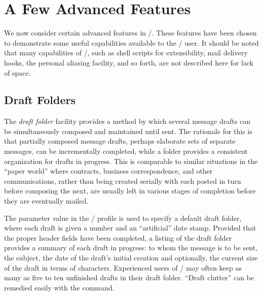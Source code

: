 \section{A Few Advanced Features}		%
We now consider certain advanced features in \MH/.
These features have been chosen to demonstrate some useful capabilities
available to the \MH/ user.
It should be noted that many capabilities of \MH/,
such as shell scripts for extensibility,
mail delivery hooks,
the personal aliasing facility,
and so forth,
are not described here for lack of space.

\subsection{Draft Folders}			%
The {\it draft folder} facility provides a method by which several
message drafts can be simultaneously composed and maintained until
sent.
The rationale for this is that partially composed message drafts,
perhaps elaborate sets of separate messages,
can be incrementally completed,
while a folder provides a consistent organization for drafts in progress.
This is comparable to similar situations in the ``paper world'' where
contracts, business correspondence, and other communications,
rather than being created serially with each posted in turn before composing
the next,
are usually left in various stages of
completion before they are eventually mailed.

The  parameter value in the \MH/ profile is used to
specify a default draft folder,
where each draft is given a number and an ``artificial'' date stamp.
Provided that the proper header fields have been completed,
a  listing of the draft folder provides a summary of
each draft in progress:
to whom the message is to be sent,
the subject,
the date of the draft's initial creation and optionally,
the current size of the draft in terms of characters.
Experienced users of \MH/ may often keep as many as five to ten unfinished
drafts in their draft folder.
``Draft clutter'' can be remedied easily with the  command.

